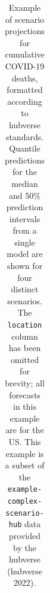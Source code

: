 \documentclass[
]{article}
\begin{document}
\begin{longtable}[]{@{}
  >{\raggedright\arraybackslash}p{}
  >{\raggedright\arraybackslash}p{}
  >{\raggedright\arraybackslash}p{}
  >{\raggedleft\arraybackslash}p{}
  >{\raggedright\arraybackslash}p{}
  >{\raggedright\arraybackslash}p{}
  >{\raggedleft\arraybackslash}p{}
  >{\raggedleft\arraybackslash}p{}@{}}

\caption{\label{tbl-example-scenarios}Example of scenario projections
for cumulative COVID-19 deaths, formatted according to hubverse
standards. Quantile predictions for the median and 50\% prediction
intervals from a single model are shown for four distinct scenarios. The
\texttt{location} column has been omitted for brevity; all forecasts in
this example are for the US. This example is a subset of the
\texttt{example-complex-scenario-hub} data provided by the hubverse
(hubverse 2022).}

\tabularnewline


\end{longtable}
\end{document}
